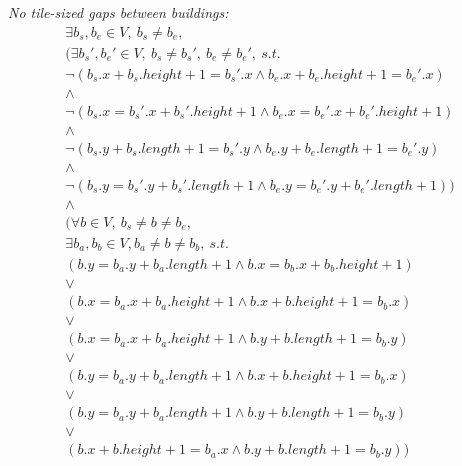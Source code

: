\documentclass[11pt]{article}
\begin{document}
\noindent
{\em  No tile-sized gaps  between buildings:}
\begin{displaymath}
  \begin{array}{l}
    \exists b_s, b_e \in V,\ b_s \neq b_e,\\
    \Big( \exists b_s', b_e' \in V,\ b_s \neq b_s',\ b_e \neq b_e',\ s.t.\\
    \lnot \left( b_s.x + b_s.height + 1 = b_s'.x \land b_e.x + b_e.height + 1
      = b_e'.x \right)\\
    \land\\
    \lnot \left( b_s.x = b_s'.x +  b_s'.height + 1 \land b_e.x = b_e'.x
      + b_e'.height + 1 \right)\\
    \land\\
    \lnot \left( b_s.y + b_s.length + 1 = b_s'.y \land b_e.y + b_e.length + 1
      = b_e'.y \right)\\
    \land\\
    \lnot \left( b_s.y = b_s'.y +  b_s'.length + 1 \land b_e.y = b_e'.y
      + b_e'.length + 1 \right) \Big)\\
    \land\\
    \Big( \forall b \in V,\ b_s \neq b \neq b_e,\\
    \exists b_a, b_b \in V, b_a \neq b \neq b_b,\ s.t.\\
    \left( b.y = b_a.y + b_a.length + 1 \land b.x = b_b.x +
      b_b.height + 1 \right)\\
    \lor\\
    \left( b.x  = b_a.x + b_a.height  + 1 \land  b.x + b.height +  1 =
      b_b.x \right)\\ 
    \lor\\
    \left( b.x  = b_a.x + b_a.height  + 1 \land  b.y + b.length +  1 =
      b_b.y \right)\\ 
    \lor\\
    \left( b.y  = b_a.y + b_a.length  + 1 \land  b.x + b.height +  1 =
      b_b.x \right)\\ 
    \lor\\
    \left( b.y  = b_a.y + b_a.length  + 1 \land  b.y + b.length +  1 =
      b_b.y \right)\\ 
    \lor\\
    \left( b.x + b.height + 1 = b_a.x \land b.y + b.length + 1 = b_b.y
    \right) \Big) 
  \end{array}
\end{displaymath}
\end{document}
